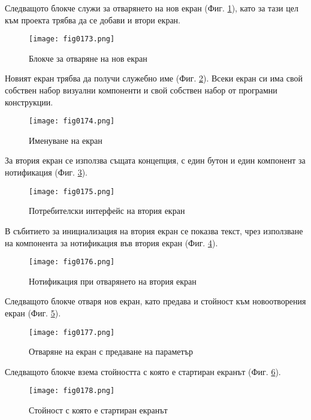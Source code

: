 Следващото блокче служи за отварянето на нов екран (Фиг. \ref{fig0173}), като за тази цел към проекта трябва да се добави и втори екран.

\begin{figure}[H]
  \centering
  \texttt{[image: fig0173.png]}
  \caption{Блокче за отваряне на нов екран}
\label{fig0173}
\end{figure}

Новият екран трябва да получи служебно име (Фиг. \ref{fig0174}). Всеки екран си има свой собствен набор визуални компоненти и свой собствен набор от програмни конструкции. 

\begin{figure}[H]
  \centering
  \texttt{[image: fig0174.png]}
  \caption{Именуване на екран}
\label{fig0174}
\end{figure}

За втория екран се използва същата концепция, с един бутон и един компонент за нотификация (Фиг. \ref{fig0175}).

\begin{figure}[H]
  \centering
  \texttt{[image: fig0175.png]}
  \caption{Потребителски интерфейс на втория екран}
\label{fig0175}
\end{figure}

В събитието за инициализация на втория екран се показва текст, чрез използване на компонента за нотификация във втория екран (Фиг. \ref{fig0176}).

\begin{figure}[H]
  \centering
  \texttt{[image: fig0176.png]}
  \caption{Нотификация при отварянето на втория екран}
\label{fig0176}
\end{figure}

Следващото блокче отваря нов екран, като предава и стойност към новоотворения екран (Фиг. \ref{fig0177}).

\begin{figure}[H]
  \centering
  \texttt{[image: fig0177.png]}
  \caption{Отваряне на екран с предаване на параметър}
\label{fig0177}
\end{figure}

Следващото блокче взема стойността с която е стартиран екранът (Фиг. \ref{fig0178}).

\begin{figure}[H]
  \centering
  \texttt{[image: fig0178.png]}
  \caption{Стойност с която е стартиран екранът}
\label{fig0178}
\end{figure}

